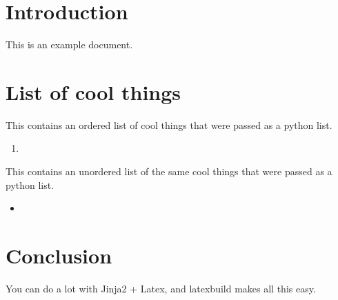 \documentclass[12pt]{article}
\title{\BLOCK{block title}\BLOCK{endblock}}
\author{\vspace{-5ex}}
\date{\vspace{-5ex}}
\begin{document}
\maketitle

\section*{Introduction}

This is an example document. 

\section*{List of cool things}

This contains an ordered list of cool things that were passed as a python list.

\begin{enumerate}
  \item {}
\end{enumerate}

This contains an unordered list of the same cool things that were passed as a python list.

\begin{itemize}
  \item {}
\end{itemize}

\section*{Conclusion}

You can do a lot with Jinja2 + Latex, and latexbuild makes all this easy.
\end{document}
